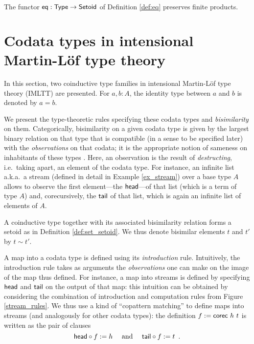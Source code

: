 \documentclass[a4paper,USenglish]{lipics}
\newcommand{\parencite}[1]{\cite{#1}}
\begin{document}
\begin{example}
  The functor $\mathsf{eq}: \mathsf{Type} \to \mathsf{Setoid}$ of Definition \ref{def:eq} preserves finite products.
\end{example}


\section{Codata types in intensional Martin-L\"of type theory}\label{sec:tri}

In this section, two coinductive type families in intensional Martin-L\"of type theory (IMLTT) \parencite{martin_lof} are presented.
For $a,b : A$, the identity type between $a$ and $b$ is denoted by $a = b$.

We present the type-theoretic rules specifying these codata types and \emph{bisimilarity} on them.
Categorically, bisimilarity on a given codata type is given by the largest binary relation on that type that is 
compatible (in a sense to be specified later) with the \emph{observations} on that codata; it is the appropriate notion of sameness on inhabitants of these types \parencite{DBLP:conf/types/Coquand93}.
Here, an observation is the result of \emph{destructing}, i.e.\ taking apart, an element of the codata type.
For instance, an infinite list a.k.a.\ a stream (defined in detail in Example \ref{ex_stream}) over a base type $A$ allows to observe the first element---the $\mathsf{head}$---of that list (which is a term of type $A$) and,
corecursively, the $\mathsf{tail}$ of that list, which is again an infinite list of elements of $A$.

A coinductive type together with its associated bisimilarity relation forms a setoid as in Definition \ref{def:set_setoid}.
We thus denote bisimilar elements $t$ and $t'$ by $t \sim t'$. 

A map into a codata type is defined using its \emph{introduction} rule.
Intuitively, the introduction rule takes as arguments the \emph{observations} one can make on the image of the map thus defined.
For instance, a map into streams is defined by specifying $\mathsf{head}$ and $\mathsf{tail}$ on the output of that map: this intuition
  can be obtained by considering the combination of introduction and computation rules from Figure \ref{stream_rules}.
  We thus use a kind of \enquote{copattern matching} \parencite{DBLP:conf/popl/AbelPTS13} to define maps into streams (and analogously for other codata types): 
  the definition $f := \mathsf{corec}~h~t$ is written as
  the pair of clauses 
   \[{\mathsf{head}} \circ {f} := h \quad \text{ and } \quad {\ensuremath{\mathsf{tail}}} \circ {f}:= t \enspace . \]
\end{document}

